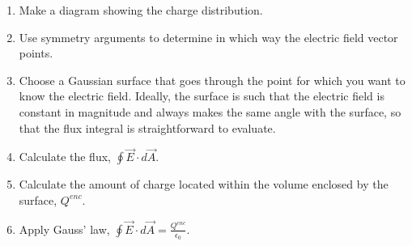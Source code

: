 \begin{enumerate}
\item Make a diagram showing the charge distribution.
\item Use symmetry arguments to determine in which way the electric field vector points.
\item Choose a Gaussian surface that goes through the point for which you want to know the electric field. Ideally, the surface is such that the electric field is constant in magnitude and always makes the same angle with the surface, so that the flux integral is straightforward to evaluate.
\item Calculate the flux, $\oint \vec E\cdot d\vec A$.
\item Calculate the amount of charge located within the volume enclosed by the surface, $Q^{enc}$.
\item Apply Gauss' law,  $\oint \vec E\cdot d\vec A=\frac{Q^{enc}}{\epsilon_0}$.
\end{enumerate}

